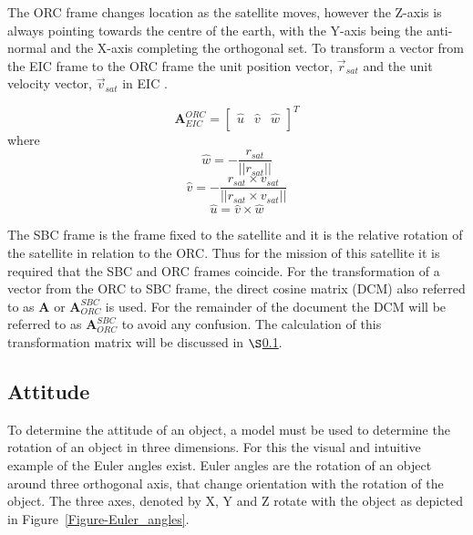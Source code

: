 The ORC frame changes location as the satellite moves, however the Z-axis is always pointing towards the centre of the earth, with the Y-axis being the anti-normal and the X-axis completing the orthogonal set. To transform a vector from the EIC frame to the ORC frame the unit position vector, $\overrightarrow{r}_{sat}$ and the unit velocity vector, $\overrightarrow{v}_{sat}$ in EIC \cite{Chen_ground-target}.

\begin{equation}
	\boldsymbol{A}^{ORC}_{EIC} = 
	\begin{bmatrix}
		\hat{u} & \hat{v} & \hat{w}\\
	\end{bmatrix}^T
\end{equation}
where
\begin{equation}
\hat{w} = -\frac{r_{sat}}{||r_{sat}||}
\end{equation}
\begin{equation}
\hat{v} = -\frac{r_{sat} \times v_{sat}}{||r_{sat} \times v_{sat}||}
\end{equation}
\begin{equation}
\hat{u} = \hat{v} \times \hat{w}
\end{equation}

The SBC frame is the frame fixed to the satellite and it is the relative rotation of the satellite in relation to the ORC. Thus for the mission of this satellite it is required that the SBC and ORC frames coincide. For the transformation of a vector from the ORC to SBC frame, the direct cosine matrix (DCM) also referred to as $\boldsymbol{A}$ or $\boldsymbol{A}^{SBC}_{ORC}$ is used. For the remainder of the document the DCM will be referred to as $\boldsymbol{A}^{SBC}_{ORC}$ to avoid any confusion. The calculation of this transformation matrix will be discussed in $\S$\ref{subsection_quaternions}.


\subsection{Attitude}
\label{subsection_quaternions}
To determine the attitude of an object, a model must be used to determine the rotation of an object in three dimensions. For this the visual and intuitive example of the Euler angles exist. Euler angles are the rotation of an object around three orthogonal axis, that change orientation with the rotation of the object. The three axes, denoted by X, Y and Z rotate with the object as depicted in Figure~\ref{Figure-Euler_angles}.

